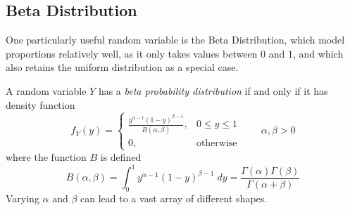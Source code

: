 \documentclass[12pt]{article}
\theoremstyle{plain}
\theoremstyle{definition}
\theoremstyle{remark}
\begin{document}



\clearpage
\subsection{Beta Distribution}

One particularly useful random variable is the Beta Distribution, which
model proportions relatively well, as it only takes values between
$0$ and $1$, and which also retains the uniform distribution as a special
case.

A random variable $Y$ has a \emph{beta probability distribution} if
and only if it has density function
\begin{equation}
   \label{pdf}
   f_Y(y) = \begin{cases} \frac{y^{\alpha -1} (1-y)^{\beta-1}}{B(\alpha,
      \beta)}, & 0\leq y \leq 1 \\
	 0, & \text{otherwise}
   \end{cases} \qquad \alpha, \beta > 0
\end{equation}
where the function $B$ is defined
   \[ B(\alpha, \beta) = \int^1_0 y^{\alpha-1}(1-y)^{\beta-1} \; dy =
      \frac{\Gamma(\alpha)\Gamma(\beta)}{\Gamma(\alpha + \beta)} \]
Varying $\alpha$ and $\beta$ can lead to a vast array of different
shapes.
\end{document}

